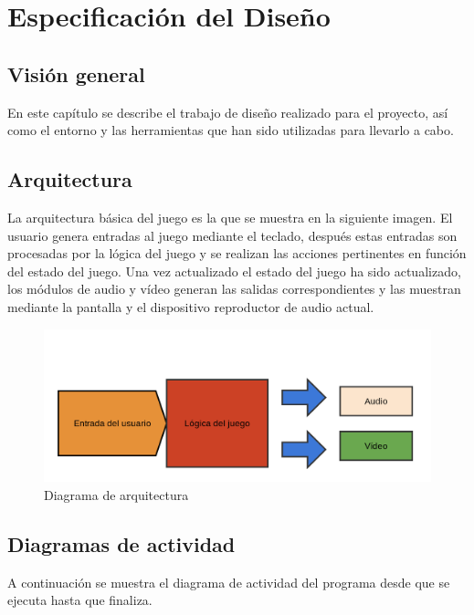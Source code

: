 \chapter{Especificación del Diseño}

\section{Visión general}

	En este capítulo se describe el trabajo de diseño realizado para el proyecto, así como el entorno y las herramientas que han sido utilizadas para llevarlo a cabo.

\section{Arquitectura}

	La arquitectura básica del juego es la que se muestra en la siguiente imagen. El usuario genera entradas al juego mediante el teclado, después estas entradas son procesadas por la lógica del juego y se realizan las acciones pertinentes en función del estado del juego. Una vez actualizado el estado del juego ha sido actualizado, los módulos de audio y vídeo generan las salidas correspondientes y las muestran mediante la pantalla y el dispositivo reproductor de audio actual.

	\begin{figure}[!htp]
		 \centering
		 \includegraphics[scale=.25]{fig/architecture}
		 \caption{Diagrama de arquitectura}
		 \label{fig:arch}
	\end{figure}

	\FloatBarrier

\section{Diagramas de actividad}

	A continuación se muestra el diagrama de actividad del programa desde que se ejecuta hasta que finaliza.

